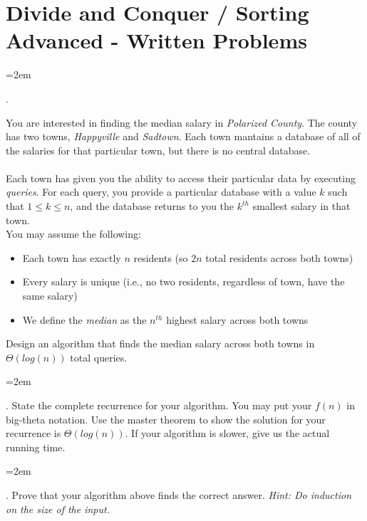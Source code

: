\documentclass[12pt]{article}
\def\homework{Divide and Conquer / Sorting Advanced - Written Problems}
\newcounter{quesnum}
\newcommand{\question}[2][??]{
\begin{list}{\labelitemi}{\leftmargin=2em}
\item [\arabic{quesnum}.] {} {#2}
\end{list}
\addtocounter{quesnum}{1}
}
\begin{document}
\section*{\homework}






\question[3]{
You are interested in finding the median salary in \emph{Polarized County}. The county has two towns, \emph{Happyville} and \emph{Sadtown}. Each town mantains a database of all of the salaries for that particular town, but there is no central database.\\
\\
Each town has given you the ability to access their particular data by executing \emph{queries}. For each query, you provide a particular database with a value $k$ such that $1 \leq k \leq n$, and the database returns to you the $k^{th}$ smallest salary in that town.
\\
You may assume the following:

\begin{itemize}
\item Each town has exactly $n$ residents (so $2n$ total residents across both towns)
\item Every salary is unique (i.e., no two residents, regardless of town, have the same salary) 
\item We define the \emph{median} as the $n^{th}$ highest salary across both towns
\end{itemize}

Design an algorithm that finds the median salary across both towns in $\Theta(log(n))$ total queries.
}



\question[3]{
State the complete recurrence for your algorithm. You may put your $f(n)$ in big-theta notation. Use the master theorem to show the solution for your recurrence is $\Theta(log(n))$. If your algorithm is slower, give us the actual running time.
}


\question[3]{
Prove that your algorithm above finds the correct answer. \emph{Hint: Do induction on the size of the input.}
}
\end{document}
